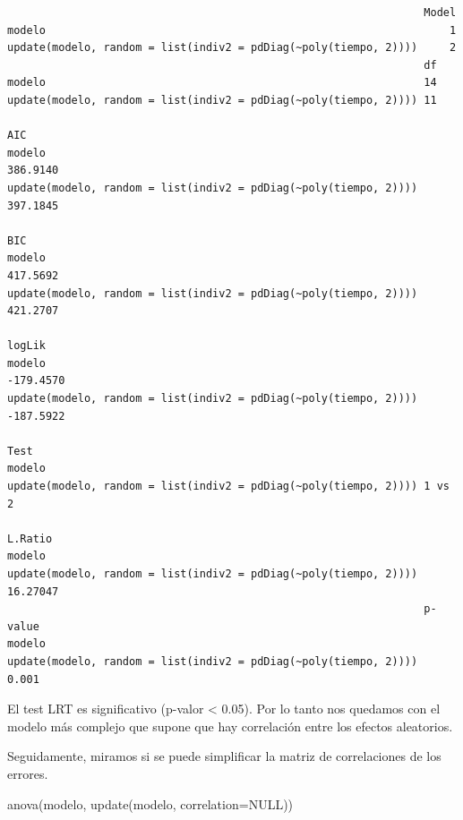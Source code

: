 \documentclass[
]{book}
\newenvironment{Shaded}{\begin{snugshade}}{\end{snugshade}}
\newcommand{\AttributeTok}[1]{\textcolor[rgb]{0.77,0.63,0.00}{#1}}
\newcommand{\ConstantTok}[1]{\textcolor[rgb]{0.00,0.00,0.00}{#1}}
\newcommand{\FunctionTok}[1]{\textcolor[rgb]{0.00,0.00,0.00}{#1}}
\newcommand{\NormalTok}[1]{#1}
\begin{document}
\begin{verbatim}
                                                                 Model
modelo                                                               1
update(modelo, random = list(indiv2 = pdDiag(~poly(tiempo, 2))))     2
                                                                 df
modelo                                                           14
update(modelo, random = list(indiv2 = pdDiag(~poly(tiempo, 2)))) 11
                                                                      AIC
modelo                                                           386.9140
update(modelo, random = list(indiv2 = pdDiag(~poly(tiempo, 2)))) 397.1845
                                                                      BIC
modelo                                                           417.5692
update(modelo, random = list(indiv2 = pdDiag(~poly(tiempo, 2)))) 421.2707
                                                                    logLik
modelo                                                           -179.4570
update(modelo, random = list(indiv2 = pdDiag(~poly(tiempo, 2)))) -187.5922
                                                                   Test
modelo                                                                 
update(modelo, random = list(indiv2 = pdDiag(~poly(tiempo, 2)))) 1 vs 2
                                                                  L.Ratio
modelo                                                                   
update(modelo, random = list(indiv2 = pdDiag(~poly(tiempo, 2)))) 16.27047
                                                                 p-value
modelo                                                                  
update(modelo, random = list(indiv2 = pdDiag(~poly(tiempo, 2))))   0.001
\end{verbatim}

El test LRT es significativo (p-valor \textless{} 0.05). Por lo tanto nos quedamos con el modelo más complejo que supone que hay correlación entre los efectos aleatorios.

Seguidamente, miramos si se puede simplificar la matriz de correlaciones de los errores.

\begin{Shaded}
\begin{Highlighting}[]
\FunctionTok{anova}\NormalTok{(modelo, }\FunctionTok{update}\NormalTok{(modelo, }\AttributeTok{correlation=}\ConstantTok{NULL}\NormalTok{))}
\end{Highlighting}
\end{Shaded}
\end{document}
